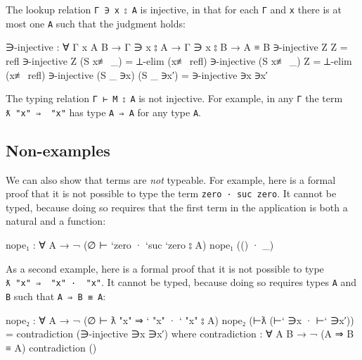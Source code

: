 The lookup relation \texttt{Γ\ ∋\ x\ ⦂\ A} is injective, in that for
each \texttt{Γ} and \texttt{x} there is at most one \texttt{A} such that
the judgment holds:

\begin{fence}
\begin{code}
∋-injective : ∀ {Γ x A B} → Γ ∋ x ⦂ A → Γ ∋ x ⦂ B → A ≡ B
∋-injective Z        Z          =  refl
∋-injective Z        (S x≢ _)   =  ⊥-elim (x≢ refl)
∋-injective (S x≢ _) Z          =  ⊥-elim (x≢ refl)
∋-injective (S _ ∋x) (S _ ∋x′)  =  ∋-injective ∋x ∋x′
\end{code}
\end{fence}

The typing relation \texttt{Γ\ ⊢\ M\ ⦂\ A} is not injective. For
example, in any \texttt{Γ} the term
\texttt{ƛ\ "x"\ ⇒\ \textasciigrave{}\ "x"} has type \texttt{A\ ⇒\ A} for
any type \texttt{A}.

\hypertarget{non-examples}{%
\subsection{Non-examples}\label{non-examples}}

We can also show that terms are \emph{not} typeable. For example, here
is a formal proof that it is not possible to type the term
\texttt{\textasciigrave{}zero\ ·\ \textasciigrave{}suc\ \textasciigrave{}zero}.
It cannot be typed, because doing so requires that the first term in the
application is both a natural and a function:

\begin{fence}
\begin{code}
nope₁ : ∀ {A} → ¬ (∅ ⊢ `zero · `suc `zero ⦂ A)
nope₁ (() · _)
\end{code}
\end{fence}

As a second example, here is a formal proof that it is not possible to
type
\texttt{ƛ\ "x"\ ⇒\ \textasciigrave{}\ "x"\ ·\ \textasciigrave{}\ "x"}.
It cannot be typed, because doing so requires types \texttt{A} and
\texttt{B} such that \texttt{A\ ⇒\ B\ ≡\ A}:

\begin{fence}
\begin{code}
nope₂ : ∀ {A} → ¬ (∅ ⊢ ƛ "x" ⇒ ` "x" · ` "x" ⦂ A)
nope₂ (⊢ƛ (⊢` ∋x · ⊢` ∋x′))  =  contradiction (∋-injective ∋x ∋x′)
  where
  contradiction : ∀ {A B} → ¬ (A ⇒ B ≡ A)
  contradiction ()
\end{code}
\end{fence}

